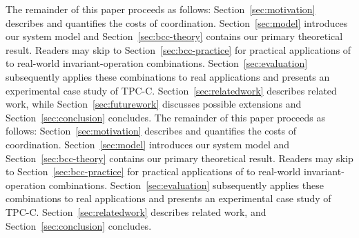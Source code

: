 \ifextended
{} The remainder of this paper proceeds as follows:
Section~\ref{sec:motivation} describes and quantifies the costs of
coordination. Section~\ref{sec:model} introduces our system model and
Section~\ref{sec:bcc-theory} contains our primary theoretical
result. Readers may skip to Section~\ref{sec:bcc-practice} for
practical applications of \iconfluence to real-world
invariant-operation combinations. Section~\ref{sec:evaluation}
subsequently applies
these combinations to real applications and presents an experimental
case study of TPC-C. Section~\ref{sec:relatedwork} describes related
work, while Section~\ref{sec:futurework} discusses possible extensions
and Section~\ref{sec:conclusion} concludes.
\else
{} The remainder of this paper proceeds as follows:
Section~\ref{sec:motivation} describes and quantifies the costs of
coordination. Section~\ref{sec:model} introduces our system model and
Section~\ref{sec:bcc-theory} contains our primary theoretical
result. Readers may skip to Section~\ref{sec:bcc-practice} for
practical applications of \iconfluence to real-world
invariant-operation combinations. Section~\ref{sec:evaluation}
subsequently applies
these combinations to real applications and presents an experimental
case study of TPC-C. Section~\ref{sec:relatedwork} describes related
work, and Section~\ref{sec:conclusion} concludes.
\fi
